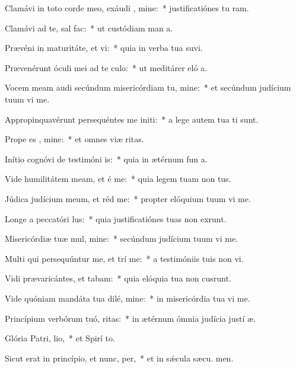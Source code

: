 \item Clamávi in toto corde meo, exáudi , mine:~* justificatiónes tu ram.
\item Clamávi ad te, sal  fac:~* ut custódiam man a.
\item Prævéni in maturitáte, et vi:~* quia in verba tua suvi.
\item Prævenérunt óculi mei ad te culo:~* ut meditárer eló a.
\item Vocem meam audi secúndum misericórdiam tu, mine:~* et secúndum judícium tuum vi me.
\item Appropinquavérunt persequéntes me initi:~* a lege autem tua  ti sunt.
\item Prope es , mine:~* et omnes viæ  ritas.
\item Inítio cognóvi de testimóni is:~* quia in ætérnum fun a.
\item Vide humilitátem meam, et é me:~* quia legem tuam non  tus.
\item Júdica judícium meum, et réd me:~* propter elóquium tuum vi me.
\item Longe a peccatóri lus:~* quia justificatiónes tuas non exrunt.
\item Misericórdiæ tuæ mul, mine:~* secúndum judícium tuum vi me.
\item Multi qui persequúntur me, et trí me:~* a testimóniis tuis non vi.
\item Vidi prævaricántes, et tabam:~* quia elóquia tua non cusrunt.
\item Vide quóniam mandáta tua dilé, mine:~* in misericórdia tua vi me.
\item Princípium verbórum tuó, ritas:~* in ætérnum ómnia judícia justí æ.
\item Glória Patri,  lio,~* et Spirí to.
\item Sicut erat in princípio, et nunc,  per,~* et in sǽcula sæcu. men.
